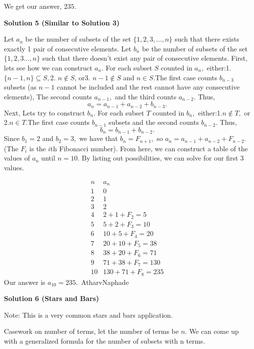 \begin{enumerate}
{{ 
We get our answer,  $\boxed{235}$.

 



\textbf{Solution 5 (Similar to Solution 3)}

Let $a_n$ be the number of subsets of the set $\{1,2,3,\ldots,n\}$ such that there exists exactly 1 pair of consecutive elements. Let $b_n$ be the number of subsets of the set $\{1, 2, 3\ldots, n\}$ such that there doesn't exist any pair of consecutive elements. First, lets see how we can construct $a_n.$ For each subset $S$ counted in $a_n,$ either:1. $\{n-1, n\}\subseteq S,$2. $n\not\in S$, or3. $n-1 \not\in S$ and $n\in S.$The first case counts $b_{n-3}$ subsets (as $n-1$ cannot be included and the rest cannot have any consecutive elements), The second counts $a_{n-1},$ and the third counts $a_{n-2}.$ Thus, 
 \[a_n = a_{n-1} + a_{n-2} + b_{n-3}.\]Next, Lets try to construct $b_n.$ For each subset $T$ counted in $b_n,$ either:1.$n \not\in T,$ or 2.$n \in T.$The first case counts $b_{n-1}$ subsets and the second counts $b_{n-2}.$ Thus, 
 \[b_n = b_{n-1} + b_{n-2}.\]Since $b_1 = 2$ and $b_2 = 3,$ we have that $b_n = F_{n+1},$ so $a_n = a_{n-1} + a_{n-2} + F_{n-2}.$ (The $F_i$ is the $i$th Fibonacci number). From here, we can construct a table of the values of $a_n$ until $n = 10.$ By listing out possibilities, we can solve for our first 3 values. 

 
 \[\begin{array}{r|l} n & a_n \\ \hline 1 & 0 \\ 2 & 1\\ 3 & 2\\ 4 & 2 + 1 + F_2 = 5\\5 & 5 + 2 + F_3 = 10\\6 & 10 + 5 + F_4 = 20 \\ 7 & 20 + 10 + F_5 = 38\\ 8 & 38 + 20 + F_6 = 71 \\ 9& 71 + 38 + F_7 = 130\\ 10 & 130 + 71 + F_8 = 235 \end{array}\]Our answer is $a_{10} = \boxed{235}.$~AtharvNaphade

 



\textbf{Solution 6 (Stars and Bars)}

Note: This is a very common stars and bars application. 

 Casework on number of terms, let the number of terms be $n$. We can come up with a generalized formula for the number  of subsets with n terms.

}}
\end{enumerate}

